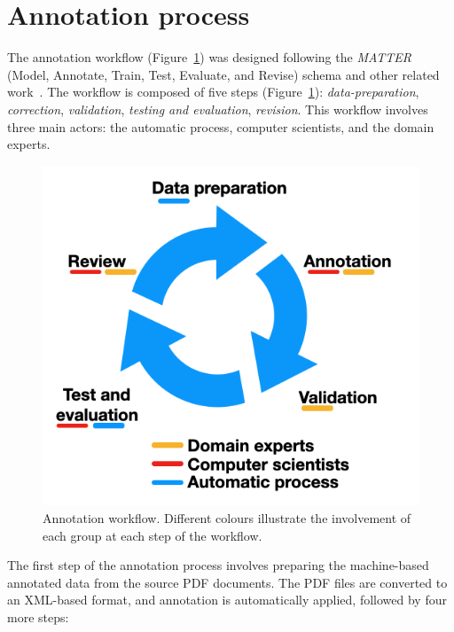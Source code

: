 \section{Annotation process}
\label{subsec:annotation-workflow}
The annotation workflow (Figure~\ref{fig:schema-comparison-modified-workflow}) was designed following the \textit{MATTER} (Model, Annotate, Train, Test, Evaluate, and Revise) schema\cite{pustejovsky2012natural} and other related work~\cite{Dieb2016, Krallinger2015TheCC}.
The workflow is composed of five steps (Figure~\ref{fig:schema-comparison-modified-workflow}): \textit{data-preparation}, \textit{correction}, \textit{validation}, \textit{testing and evaluation}, \textit{revision}. 
This workflow involves three main actors: the automatic process, computer scientists, and the domain experts.


\begin{figure}[htbp]
\centering
  \centering
  \includegraphics[width=0.5\linewidth]{figures/supermat/Fig2.png}
  \caption{Annotation workflow. Different colours illustrate the involvement of each group at each step of the workflow.}
  \label{fig:schema-comparison-modified-workflow}
\end{figure}

The first step of the annotation process involves preparing the machine-based annotated data from the source PDF documents. 
The PDF files are converted to an XML-based format, and annotation is automatically applied, followed by four more steps: 

